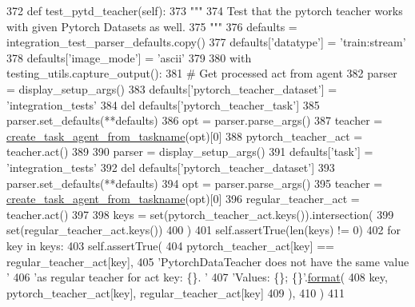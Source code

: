 \begin{DoxyCode}
372     \textcolor{keyword}{def }test\_pytd\_teacher(self):
373         \textcolor{stringliteral}{"""}
374 \textcolor{stringliteral}{        Test that the pytorch teacher works with given Pytorch Datasets as well.}
375 \textcolor{stringliteral}{        """}
376         defaults = integration\_test\_parser\_defaults.copy()
377         defaults[\textcolor{stringliteral}{'datatype'}] = \textcolor{stringliteral}{'train:stream'}
378         defaults[\textcolor{stringliteral}{'image\_mode'}] = \textcolor{stringliteral}{'ascii'}
379 
380         with testing\_utils.capture\_output():
381             \textcolor{comment}{# Get processed act from agent}
382             parser = display\_setup\_args()
383             defaults[\textcolor{stringliteral}{'pytorch\_teacher\_dataset'}] = \textcolor{stringliteral}{'integration\_tests'}
384             del defaults[\textcolor{stringliteral}{'pytorch\_teacher\_task'}]
385             parser.set\_defaults(**defaults)
386             opt = parser.parse\_args()
387             teacher = \hyperlink{namespaceparlai_1_1core_1_1agents_ab4473fa54af02b5ab385b41b51dacd10}{create\_task\_agent\_from\_taskname}(opt)[0]
388             pytorch\_teacher\_act = teacher.act()
389 
390             parser = display\_setup\_args()
391             defaults[\textcolor{stringliteral}{'task'}] = \textcolor{stringliteral}{'integration\_tests'}
392             del defaults[\textcolor{stringliteral}{'pytorch\_teacher\_dataset'}]
393             parser.set\_defaults(**defaults)
394             opt = parser.parse\_args()
395             teacher = \hyperlink{namespaceparlai_1_1core_1_1agents_ab4473fa54af02b5ab385b41b51dacd10}{create\_task\_agent\_from\_taskname}(opt)[0]
396             regular\_teacher\_act = teacher.act()
397 
398         keys = set(pytorch\_teacher\_act.keys()).intersection(
399             set(regular\_teacher\_act.keys())
400         )
401         self.assertTrue(len(keys) != 0)
402         \textcolor{keywordflow}{for} key \textcolor{keywordflow}{in} keys:
403             self.assertTrue(
404                 pytorch\_teacher\_act[key] == regular\_teacher\_act[key],
405                 \textcolor{stringliteral}{'PytorchDataTeacher does not have the same value '}
406                 \textcolor{stringliteral}{'as regular teacher for act key: \{\}. '}
407                 \textcolor{stringliteral}{'Values: \{\}; \{\}'}.\hyperlink{namespaceparlai_1_1chat__service_1_1services_1_1messenger_1_1shared__utils_a32e2e2022b824fbaf80c747160b52a76}{format}(
408                     key, pytorch\_teacher\_act[key], regular\_teacher\_act[key]
409                 ),
410             )
411 
\end{DoxyCode}
